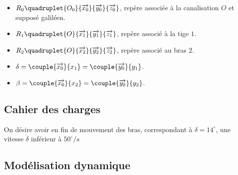 \begin{itemize}
\item $R_0\quadruplet{O_0}{\overrightarrow{x_0}}{\overrightarrow{y_0}}{\overrightarrow{z_0}}$, repère associée à la canalisation $O$ et supposé galiléen.
\item $R_1\quadruplet{O}{\overrightarrow{x_1}}{\overrightarrow{y_1}}{\overrightarrow{z_1}}$, repère associé à la tige $1$.
\item $R_2\quadruplet{O}{\overrightarrow{x_2}}{\overrightarrow{y_2}}{\overrightarrow{z_2}}$, repère associé au bras $2$.
\item $\delta=\couple{\overrightarrow{x_0}}{{x_1}}=\couple{\overrightarrow{y_0}}{{y_1}}$.
\item $\beta=\couple{\overrightarrow{x_0}}{{x_2}}=\couple{\overrightarrow{y_0}}{{y_2}}$.
\end{itemize}

\fi
\subsection*{Cahier des charges}

\ifprof
\else
On désire avoir en fin de mouvement des bras, correspondant à $\delta=14^{\circ}$, une vitesse $\dot{\delta}$ inférieur à $50^{\circ}/s$
\fi
\subsection*{Modélisation dynamique}

